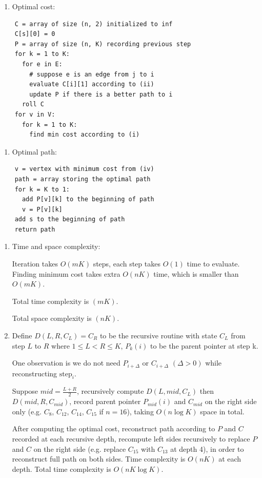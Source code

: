 \documentclass[11pt]{article}
\begin{document}
\begin{description}
\begin{enumerate}
  \item[(iv)] Optimal cost:
\end{enumerate}
\begin{verbatim}
    C = array of size (n, 2) initialized to inf
    C[s][0] = 0
    P = array of size (n, K) recording previous step
    for k = 1 to K:
      for e in E:
        # suppose e is an edge from j to i
        evaluate C[i][1] according to (ii)
        update P if there is a better path to i
      roll C
    for v in V:
      for k = 1 to K:
        find min cost according to (i)
\end{verbatim}
\begin{enumerate}
  \item[(v)] Optimal path:
\end{enumerate}
\begin{verbatim}
    v = vertex with minimum cost from (iv)
    path = array storing the optimal path
    for k = K to 1:
      add P[v][k] to the beginning of path
      v = P[v][k]
    add s to the beginning of path
    return path
\end{verbatim}
\begin{enumerate}
  \item[(vi)] Time and space complexity:
  
  Iteration takes $O(mK)$ steps, each step takes $O(1)$ time to evaluate.
  Finding minimum cost takes extra $O(nK)$ time, which is smaller than $O(mK)$.

  Total time complexity is $(mK)$.

  Total space complexity is $(nK)$.

  \item[\textbf{(b)}]
  Define $D(L, R, C_L)=C_R$ to be the recursive routine with state $C_L$ from step $L$ to $R$ 
  where $1 \le L < R \le K$, $P_k(i)$ to be the parent pointer at step k.

  One observation is we do not need $P_{i+\Delta}$ or $C_{i+\Delta}$ $(\Delta > 0)$ 
  while reconstructing $\text{step}_i$.

  Suppose $mid=\frac{L+R}{2}$, recursively compute 
  $D(L, mid, C_L)$ then $D(mid, R, C_{mid})$, record parent pointer $P_{mid}(i)$ and $C_{mid}$
  on the right side only (e.g. $C_8$, $C_{12}$, $C_{14}$, $C_{15}$ if $n=16$), 
  taking $O(n\log K)$ space in total.

  After computing the optimal cost, reconstruct path according to $P$ and $C$ recorded at each
  recursive depth, recompute left sides recursively to replace $P$ and $C$ on the right side 
  (e.g. replace $C_{15}$ with $C_{13}$ at depth 4), 
  in order to reconstruct full path on both sides. Time complexity is $O(nK)$ at each depth.
  Total time complexity is $O(nK\log K)$.



\end{enumerate}



\end{description}
\end{document}

